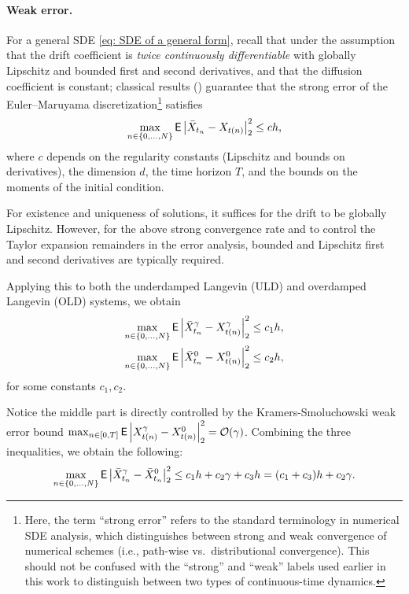 \documentclass[12pt]{article}
\begin{document}
\paragraph{Weak error.}
For a general SDE \eqref{eq: SDE of a general form}, recall that under the assumption that the drift coefficient is \emph{twice continuously differentiable} with globally Lipschitz and bounded first and second derivatives, and that the diffusion coefficient is constant; classical results (\cite{kloeden1992numerical}) guarantee that the strong error of the Euler--Maruyama discretization\footnote{Here, the term ``strong error'' refers to the standard terminology in numerical SDE analysis, which distinguishes between strong and weak convergence of numerical schemes (i.e., path-wise vs.\ distributional convergence). This should not be confused with the ``strong'' and ``weak'' labels used earlier in this work to distinguish between two types of continuous-time dynamics.} satisfies
\[
\max_{n\in\{0,\ldots,N\}} {\mathsf E}\left|\bar{X}_{t_n} - X_{t(n)}\right|_2^2 \leq c h,
\]
where $c$ depends on the regularity constants (Lipschitz and bounds on derivatives), the dimension $d$, the time horizon $T$, and the bounds on the moments of the initial condition.

\begin{remark}
    For existence and uniqueness of solutions, it suffices for the drift to be globally Lipschitz. However, for the above strong convergence rate and to control the Taylor expansion remainders in the error analysis, bounded and Lipschitz first and second derivatives are typically required.
\end{remark}

Applying this to both the underdamped Langevin (ULD) and overdamped Langevin (OLD) systems, we obtain
\begin{align*}
\max_{n\in\{0,\ldots,N\}} {\mathsf E}\left|\bar{X}_{t_n}^\gamma - X_{t(n)}^\gamma\right|_2^2 &\leq c_1 h, \\
\max_{n\in\{0,\ldots,N\}} {\mathsf E}\left|\bar{X}_{t_n}^0 - X_{t(n)}^0\right|_2^2 &\leq c_2 h,
\end{align*}
for some constants $c_1, c_2$.

Notice the middle part is directly controlled by the Kramers-Smoluchowski weak error bound $\max_{n\in[0,T]}{\mathsf E}\left|X_{t(n)}^\gamma - X_{t(n)}^0\right|_2^2 = \mathcal{O}(\gamma)$.
Combining the three inequalities, we obtain the following:
\[
\max_{n\in\{0,\ldots,N\}} {\mathsf E}\left|\bar{X}_{t_n}^\gamma - \bar{X}_{t_n}^0\right|_2^2
\leq c_1 h + c_2 \gamma + c_3 h = (c_1 + c_3)h + c_2 \gamma.
\]
\end{document}
